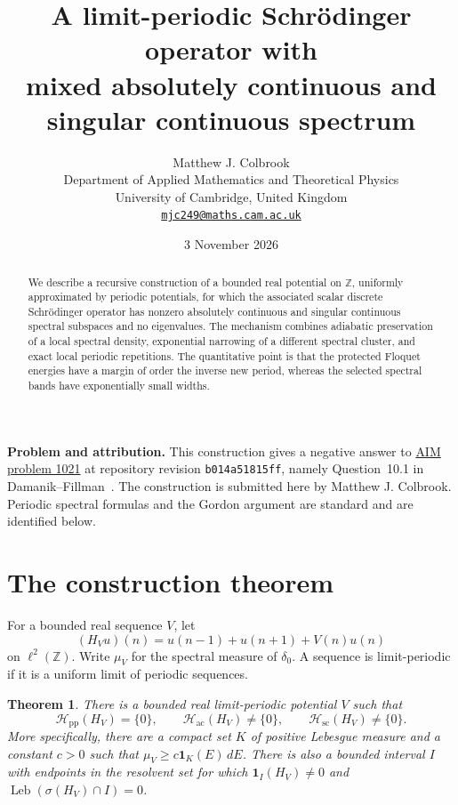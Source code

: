 \documentclass[11pt,a4paper]{article}
\title{\textbf{A limit-periodic Schr\"odinger operator with\\
mixed absolutely continuous and singular continuous spectrum}}
\author{Matthew J. Colbrook\\[3pt]
{\small Department of Applied Mathematics and Theoretical Physics}\\
{\small University of Cambridge, United Kingdom}\\
{\small\href{mailto:mjc249@maths.cam.ac.uk}{\texttt{mjc249@maths.cam.ac.uk}}}}
\date{3 November 2026}
\numberwithin{equation}{section}
\newtheorem{theorem}{Theorem}
\theoremstyle{remark}
\newcommand{\Z}{\mathbb Z}
\newcommand{\spec}{\sigma}
\newcommand{\Leb}{\operatorname{Leb}}
\newcommand{\dd}{\,d}
\begin{document}
\maketitle

\begin{abstract}
We describe a recursive construction of a bounded real potential on
$\Z$, uniformly approximated by periodic potentials, for which the
associated scalar discrete Schr\"odinger operator has nonzero absolutely
continuous and singular continuous spectral subspaces and no eigenvalues.
The mechanism combines adiabatic preservation of a local spectral density,
exponential narrowing of a different spectral cluster, and exact local
periodic repetitions. The quantitative point is that the protected
Floquet energies have a margin of order the inverse new period, whereas
the selected spectral bands have exponentially small widths.
\end{abstract}

\noindent\textbf{Problem and attribution.}
This construction gives a negative answer to
\href{https://github.com/MColbrook/AIM/blob/b014a51815ffd025d2b1abc4a3954205dfbf61e0/problems/1021-must-limit-periodic-discrete-schrodinger-operators-have-pure-spectral-type.md}{AIM problem 1021}
at repository revision \texttt{b014a51815ff}, namely Question~10.1 in
Damanik--Fillman~\cite{DF}. The construction is submitted here by
Matthew J. Colbrook. Periodic spectral formulas and the Gordon
argument are standard and are identified below.

\section{The construction theorem}
For a bounded real sequence $V$, let
\[
(H_Vu)(n)=u(n-1)+u(n+1)+V(n)u(n)
\]
on $\ell^2(\Z)$. Write $\mu_V$ for the spectral measure of $\delta_0$.
A sequence is limit-periodic if it is a uniform limit of periodic
sequences.

\begin{theorem}\label{thm:main}
There is a bounded real limit-periodic potential $V$ such that
\[
\mathcal H_{\mathrm{pp}}(H_V)=\{0\},\qquad
\mathcal H_{\mathrm{ac}}(H_V)\ne\{0\},\qquad
\mathcal H_{\mathrm{sc}}(H_V)\ne\{0\}.
\]
More specifically, there are a compact set $K$ of positive Lebesgue
measure and a constant $c>0$ such that
$\mu_V\ge c\mathbf1_K(E)\dd E$. There is also a bounded interval $I$
with endpoints in the resolvent set for which
$\mathbf1_I(H_V)\ne0$ and $\Leb(\spec(H_V)\cap I)=0$.
\end{theorem}
\end{document}
